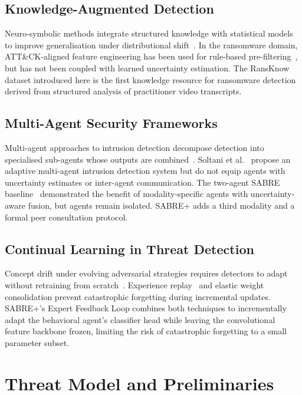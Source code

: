 \documentclass[journal]{IEEEtran}
\begin{document}
\subsection{Knowledge-Augmented Detection}
Neuro-symbolic methods integrate structured knowledge with
statistical models to improve generalisation under distributional
shift~\cite{Ispahany2024Survey}.
In the ransomware domain, ATT\&CK-aligned feature engineering has
been used for rule-based pre-filtering~\cite{razaulla2023age}, but has
not been coupled with learned uncertainty estimation.
The RansKnow dataset introduced here is the first knowledge resource
for ransomware detection derived from structured analysis of practitioner
video transcripts.

\subsection{Multi-Agent Security Frameworks}
Multi-agent approaches to intrusion detection decompose detection
into specialised sub-agents whose outputs are
combined~\cite{MultiAgentAdaptiveDetection2023}.
Soltani et al.~\cite{MultiAgentAdaptiveDetection2023} propose an
adaptive multi-agent intrusion detection system but do not equip
agents with uncertainty estimates or inter-agent communication.
The two-agent SABRE baseline~\cite{kabuye2026sabre} demonstrated
the benefit of modality-specific agents with uncertainty-aware fusion,
but agents remain isolated.
SABRE+ adds a third modality and a formal peer consultation protocol.

\subsection{Continual Learning in Threat Detection}
Concept drift under evolving adversarial strategies requires detectors
to adapt without retraining from scratch~\cite{Ceschin2022ConceptDrift}.
Experience replay~\cite{rolnick2019experience} and elastic weight
consolidation prevent catastrophic forgetting during incremental updates.
SABRE+'s Expert Feedback Loop combines both techniques to incrementally adapt
the behavioral agent's classifier head while leaving the convolutional feature
backbone frozen, limiting the risk of catastrophic forgetting to a small
parameter subset.

\section{Threat Model and Preliminaries}
\label{sec:preliminaries}
\end{document}
